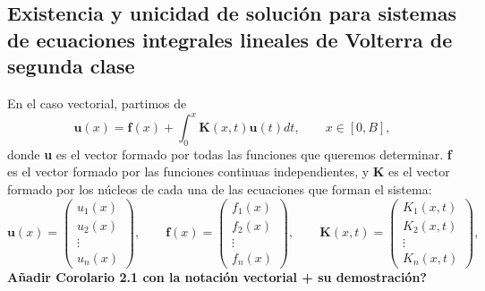 \subsection{Existencia y unicidad de solución para sistemas de ecuaciones integrales lineales de Volterra de segunda clase}
En el caso vectorial, partimos de
\begin{equation}
	\textbf{u}(x) = \textbf{f}(x) + \int_0^x \textbf{K}(x,t)\textbf{u}(t)dt, \qquad x \in [0,B],
\end{equation}
donde \textbf{u} es el vector formado por todas las funciones que queremos determinar. \textbf{f} es el vector formado por las funciones continuas independientes, y \textbf{K} es el vector formado por los núcleos de cada una de las ecuaciones que forman el sistema:
\begin{equation}
	\textbf{u}(x) = \begin{pmatrix}	u_1(x) \\ u_2(x) \\ \vdots \\ u_n(x)	\end{pmatrix}, \qquad \textbf{f}(x) = \begin{pmatrix}	f_1(x) \\ f_2(x) \\ \vdots \\ f_n(x)	\end{pmatrix}, \qquad \textbf{K}(x,t) = \begin{pmatrix}	K_1(x,t) \\ K_2(x,t) \\ \vdots \\ K_n(x,t)	\end{pmatrix},
\end{equation}
\textbf{Añadir Corolario 2.1 con la notación vectorial + su demostración?}

\endinput
